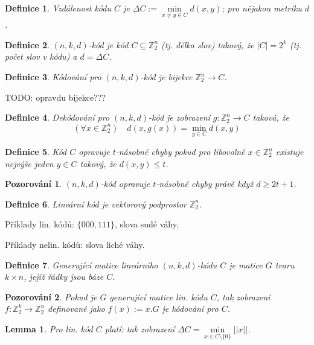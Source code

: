 \documentclass[a4paper,10pt,titlepage]{article} \usepackage[utf8]{inputenc}
\newtheorem{define}{Definice}
\newtheorem*{observ}{Pozorování}
\newtheorem*{lemma}{Lemma}
\begin{document}
\begin{define}
Vzdálenost kódu $C$ je $\Delta C := \min\limits_{x \neq y \in C} d(x,y)$; pro nějakou metriku $d$.
\end{define}

\begin{define}
$(n,k,d)$-kód je kód $C \subseteq \mathbb{Z}^n_2$ (tj. délka slov) takový, že $|C| = 2^k$ (tj. počet slov v kódu) a $d = \Delta C$.
\end{define}

\begin{define}
Kódování pro $(n,k,d)$-kód je bijekce $\mathbb{Z}^n_2 \rightarrow C$.
\end{define}

TODO: opravdu bijekce???

\begin{define}
Dekódování pro $(n,k,d)$-kód je zobrazení $g: \mathbb{Z}^n_2 \rightarrow C$ taková, že
$$
(\forall x \in \mathbb{Z}^n_2)\quad d(x,g(x)) = \min\limits_{y \in C} d(x,y)
$$
\end{define}

\begin{define}
Kód $C$ opravuje $t$-násobné chyby pokud pro libovolné $x \in \mathbb{Z}^n_2$ existuje nejvýše jeden $y \in C$ takový, že $d(x,y) \leq t$.
\end{define}

\begin{observ}
$(n,k,d)$-kód opravuje $t$-násobné chyby právě když $d \geq 2t+1$.
\end{observ}

\begin{define}
Lineární kód je vektorový podprostor $\mathbb{Z}^n_2$.
\end{define}

Příklady lin. kódů: $\{000,111\}$, slova sudé váhy.

Příklady nelin. kódů: slova liché váhy.

\begin{define}
Generující matice lineárního $(n,k,d)$-kódu $C$ je matice $G$ tvaru $k \times n$, jejíž řádky jsou báze $C$.
\end{define}

\begin{observ}
Pokud je $G$ generující matice lin. kódu $C$, tak zobrazení $f: \mathbb{Z}^k_2 \rightarrow \mathbb{Z}^n_2$ definované jako $f(x) := x.G$ je kódování pro $C$.
\end{observ}

\begin{lemma}
Pro lin. kód $C$ platí: tak zobrazení $\Delta C = \min\limits_{x \in C \setminus \{0\}} ||x||$.
\end{lemma}
\end{document}

